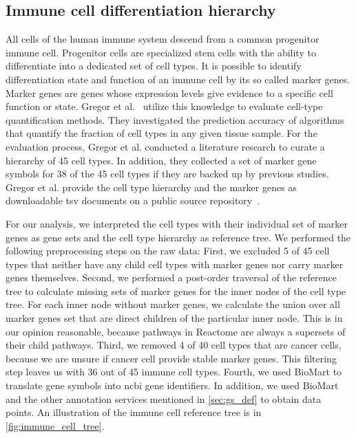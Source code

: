 \documentclass{thesisclass}
\begin{document}
\subsection{Immune cell differentiation hierarchy}

All cells of the human immune system descend from a common progenitor immune cell.
Progenitor cells are specialized stem cells with the ability to differentiate into a dedicated set of cell types.
It is possible to identify differentiation state and function of an immune cell by its so called marker genes. 
Marker genes are genes whose expression levels give evidence to a specific cell function or state. 
Gregor et al.~\cite{Sturm463828} utilize this knowledge to evaluate cell-type quantification methods. 
They investigated the prediction accuracy of algorithms that quantify the fraction of cell types in any given tissue sample.
For the evaluation process, Gregor et al. conducted a literature research to curate a hierarchy of 45 cell types.
In addition, they collected a set of marker gene symbols for 38 of the 45 cell types if they are backed up by previous studies.
Gregor et al. provide the cell type hierarchy and the marker genes as downloadable \acrfull{tsv} documents on a public source repository~\cite{Sturm463828}. 

For our analysis, we interpreted the cell types with their individual set of marker genes as gene sets and the cell type hierarchy as reference tree. We performed the following preprocessing steps on the raw data: 
First, we excluded 5 of 45 cell types that neither have any child cell types with marker genes nor carry marker genes themselves.
Second, we performed a post-order traversal of the reference tree to calculate missing sets of marker genes for the inner nodes of the cell type tree.
For each inner node without marker genes, we calculate the union over all marker genes set that are direct children of the particular inner node. 
This is in our opinion reasonable, because pathways in Reactome are always a supersets of their child pathways.
Third, we removed 4 of 40 cell types that are cancer cells, because we are unsure if cancer cell provide stable marker genes. This filtering step leaves us with 36 out of 45 immune cell types. 
Fourth, we used BioMart to translate gene symbols into \acrshort{ncbi} gene identifiers. In addition, we used BioMart and the other annotation services mentioned in \cref{sec:gs_def} to obtain data points. An illustration of the immune cell reference tree is in \cref{fig:immune_cell_tree}.
\end{document}
